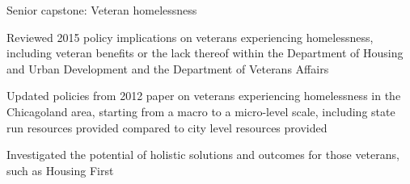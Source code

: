 \documentclass{../styles/cv}
\begin{document}
\subsectiondate
    {Senior capstone: Veteran homelessness}
    {}
\resumesublistbegin
    \item Reviewed 2015 policy implications on veterans experiencing homelessness, including veteran benefits or the lack thereof within the Department of Housing and Urban Development and the Department of Veterans Affairs
    \item Updated policies from 2012 paper on veterans experiencing homelessness in the Chicagoland area, starting from a macro to a micro-level scale, including state run resources provided compared to city level resources provided
    \item Investigated the potential of holistic solutions and outcomes for those veterans, such as Housing First
\resumesublistend
\end{document}
